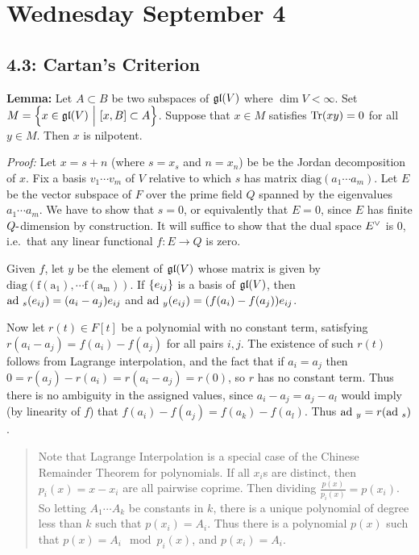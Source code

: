 \hypertarget{wednesday-september-4}{%
\section{Wednesday September 4}\label{wednesday-september-4}}

\hypertarget{cartans-criterion}{%
\subsection{4.3: Cartan's Criterion}\label{cartans-criterion}}

\textbf{Lemma:} Let \(A\subset B\) be two subspaces of \({\mathfrak{gl}}(V)\)
where \(\dim V < \infty\). Set
\(M = \left\{{x \in {\mathfrak{gl}}(V) {~\mathrel{\Big|}~} [x, B] \subset A}\right\}\). Suppose
that \(x\in M\) satisfies \(\mathrm{Tr}(xy) = 0\) for all \(y\in M\). Then \(x\)
is nilpotent.

\emph{Proof:} Let \(x = s+n\) (where \(s = x_s\) and \(n = x_n\)) be be
the Jordan decomposition of \(x\). Fix a basis \(v_1 \cdots v_m\) of
\(V\) relative to which \(s\) has matrix
\(\mathrm{diag}(a_1 \cdots a_m)\). Let \(E\) be the vector subspace of
\(F\) over the prime field \(Q\) spanned by the eigenvalues
\(a_1 \cdots a_m\). We have to show that \(s = 0\), or equivalently that
\(E= 0\), since \(E\) has finite \(Q{\hbox{-}}\)dimension by construction. It
will suffice to show that the dual space \(E^\vee\) is 0, i.e.~that any
linear functional \(f: E \to Q\) is zero.

Given \(f\), let \(y\) be the element of \({\mathfrak{gl}}(V)\) whose matrix is
given by \(\mathrm{diag{(f(a_1), \cdots f(a_m))}}\). If
\(\left\{{e_{ij}}\right\}\) is a basis of \({\mathfrak{gl}}(V)\), then
\(\mathrm{ad}~_s(e_{ij}) = (a_i - a_j)e_{ij}\) and
\(\mathrm{ad}~_y(e_{ij}) = (f(a_i) - f(a_j)) e_{ij}\).

Now let \(r(t) \in F[t]\) be a polynomial with no constant term,
satisfying \(r(a_i - a_j) = f(a_i) - f(a_j)\) for all pairs \(i,j\). The
existence of such \(r(t)\) follows from Lagrange interpolation, and the
fact that if \(a_i = a_j\) then
\(0 = r(a_j) - r(a_i) = r(a_i - a_j) = r(0)\), so \(r\) has no constant
term. Thus there is no ambiguity in the assigned values, since
\(a_i -a_j = a_j - a_l\) would imply (by linearity of \(f\)) that
\(f(a_i) - f(a_j) = f(a_k) - f(a_l)\). Thus \(\mathrm{ad}~_y = r(\mathrm{ad}~_s)\).

\begin{quote}
Note that Lagrange Interpolation is a special case of the Chinese
Remainder Theorem for polynomials. If all \(x_i\)s are distinct, then
\(p_i(x) = x - x_i\) are all pairwise coprime. Then dividing
\(\frac{p(x)}{p_i(x)} = p(x_i)\). So letting \(A_1 \cdots A_k\) be
constants in \(k\), there is a unique polynomial of degree less than
\(k\) such that \(p(x_i) = A_i\). Thus there is a polynomial \(p(x)\)
such that \(p(x) = A_i \mod p_i(x)\), and \(p(x_i) = A_i\).
\end{quote}

